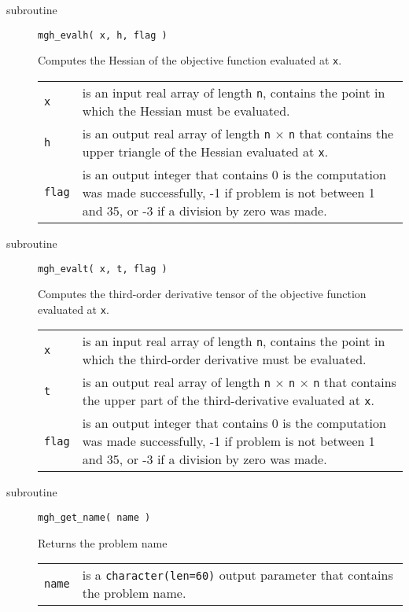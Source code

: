 \documentclass[11pt]{article}
\begin{document}
\begin{description}
\item[subroutine] \verb|mgh_evalh( x, h, flag )|

  Computes the Hessian of the objective function evaluated at
  \verb|x|.

  \begin{longtable}{p{1cm} p{13.4cm}}
    \verb|x| & is an input real array of length \verb|n|, contains the
    point in which the Hessian must be evaluated. \\[1ex]

    \verb|h| & is an output real array of length \verb|n| $\times$
    \verb|n| that contains the upper triangle of the Hessian evaluated
    at \verb|x|. \\[1ex]

    \verb|flag| & is an output integer that contains 0 is the
    computation was made successfully, -1 if problem is not between 1
    and 35, or -3 if a division by zero was made.
  \end{longtable}

\item[subroutine] \verb|mgh_evalt( x, t, flag )|

  Computes the third-order derivative tensor of the objective function
  evaluated at \verb|x|.

  \begin{longtable}{p{1cm} p{13.4cm}}
    \verb|x| & is an input real array of length \verb|n|, contains the
    point in which the third-order derivative must be
    evaluated. \\[1ex]

    \verb|t| & is an output real array of length \verb|n| $\times$
    \verb|n| $\times$ \verb|n| that contains the upper part of the
    third-derivative evaluated at \verb|x|. \\[1ex]

    \verb|flag| & is an output integer that contains 0 is the
    computation was made successfully, -1 if problem is not between 1
    and 35, or -3 if a division by zero was made.
  \end{longtable}

\item[subroutine] \verb|mgh_get_name( name )|

  Returns the problem name

  \begin{longtable}{p{1cm} p{13.4cm}}
    \verb|name| & is a \verb|character(len=60)| output parameter that
    contains the problem name.
  \end{longtable}

\end{description}
\end{document}
